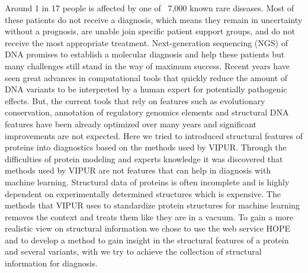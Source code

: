 Around 1 in 17 people is affected by one of ~7,000 known rare diseases. Most of these patients do not receive a diagnosis, which means they remain in uncertainty without a prognosis, are unable join specific patient support groups, and do not receive the most appropriate treatment.
Next-generation sequencing (NGS) of DNA promises to establish a molecular diagnosis and help these patients but many challenges still stand in the way of maximum success.
Recent years have seen great advances in computational tools that quickly reduce the amount of DNA variants to be interpreted by a human expert for potentially pathogenic effects.
But, the current tools that rely on features such as evolutionary conservation, annotation of regulatory genomics elements and structural DNA features have been already optimized over many years and significant improvements are not expected. 
Here we tried to introduced structural features of proteins into diagnostics based on the methods used by VIPUR. Through the difficulties of protein modeling and experts knowledge it was discovered that methods used by VIPUR are not features that can help in diagnosis with machine learning. Structural data of proteins is often incomplete and is highly dependent on experimentally determined structures which is expensive. The methods that VIPUR uses to standardize protein structures for machine learning removes the context and treats them like they are in a vacuum. To gain a more realistic view on structural information we chose to use the web service HOPE and to develop a method to gain insight in the structural features of a protein and several variants, with we try to achieve the collection of structural information for diagnosis.